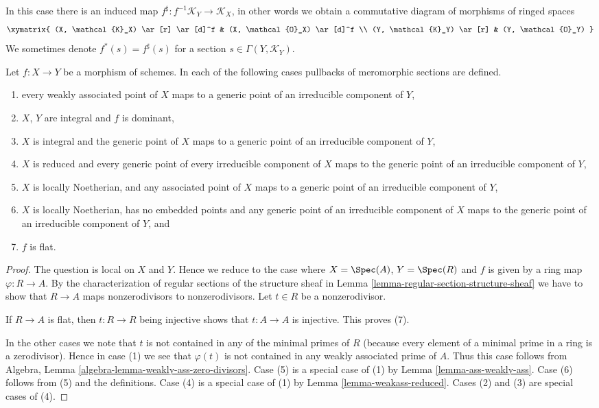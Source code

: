\noindent
In this case there is an induced map
$f^\sharp : f^{-1}\mathcal{K}_Y \to \mathcal{K}_X$,
in other words we obtain a commutative diagram of morphisms
of ringed spaces
$$
\xymatrix{
(X, \mathcal{K}_X) \ar[r] \ar[d]^f &
(X, \mathcal{O}_X) \ar[d]^f \\
(Y, \mathcal{K}_Y) \ar[r] &
(Y, \mathcal{O}_Y)
}
$$
We sometimes denote $f^*(s) = f^\sharp(s)$ for a
section $s \in \Gamma(Y, \mathcal{K}_Y)$.

\begin{lemma}
\label{lemma-pullback-meromorphic-sections-defined}
Let $f : X \to Y$ be a morphism of schemes.
In each of the following cases pullbacks of meromorphic
sections are defined.
\begin{enumerate}
\item every weakly associated point of $X$ maps to
a generic point of an irreducible component of $Y$,
\item $X$, $Y$ are integral and $f$ is dominant,
\item $X$ is integral and the generic point of $X$ maps
to a generic point of an irreducible component of $Y$,
\item $X$ is reduced and every generic point of every irreducible
component of $X$ maps to the generic point of an irreducible component
of $Y$,
\item $X$ is locally Noetherian, and any associated point of
$X$ maps to a generic point of an irreducible component of $Y$,
\item $X$ is locally Noetherian, has no embedded points and
any generic point of an irreducible component of
$X$ maps to the generic point of an irreducible component of $Y$, and
\item $f$ is flat.
\end{enumerate}
\end{lemma}

\begin{proof}
The question is local on $X$ and $Y$. Hence we reduce to the case where
$X = \Spec(A)$, $Y = \Spec(R)$ and $f$ is given by a ring map
$\varphi : R \to A$.
By the characterization of regular sections of the structure sheaf
in Lemma \ref{lemma-regular-section-structure-sheaf} we have to
show that $R \to A$ maps nonzerodivisors to nonzerodivisors.
Let $t \in R$ be a nonzerodivisor.

\medskip\noindent
If $R \to A$ is flat, then $t : R \to R$ being injective
shows that $t : A \to A$ is injective. This proves (7).

\medskip\noindent
In the other cases we note that $t$ is not contained in any of
the minimal primes of $R$ (because every element of a minimal
prime in a ring is a zerodivisor).
Hence in case (1) we see that $\varphi(t)$ is not contained
in any weakly associated prime of $A$. Thus this case follows from
Algebra, Lemma \ref{algebra-lemma-weakly-ass-zero-divisors}.
Case (5) is a special case of (1) by Lemma \ref{lemma-ass-weakly-ass}.
Case (6) follows from (5) and the definitions.
Case (4) is a special case of (1) by
Lemma \ref{lemma-weakass-reduced}.
Cases (2) and (3) are special cases of (4).
\end{proof}



